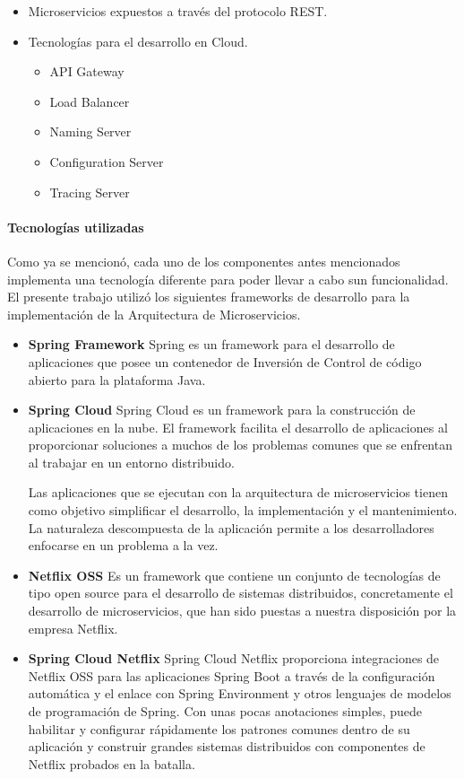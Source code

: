 \begin{itemize}
	\item Microservicios expuestos a través del protocolo REST.
	\item Tecnologías para el desarrollo en Cloud.
	\begin{itemize}
		\item API Gateway
		\item Load Balancer
		\item Naming Server
		\item Configuration Server
		\item Tracing Server
	\end{itemize}
\end{itemize}

\paragraph{Tecnologías utilizadas}
Como ya se mencionó, cada uno de los componentes antes mencionados implementa una tecnología diferente para poder llevar a cabo sun funcionalidad. El presente trabajo utilizó los siguientes frameworks de desarrollo para la implementación de la Arquitectura de Microservicios.

\begin{itemize}
\item \textbf{Spring Framework} Spring es un framework para el desarrollo de aplicaciones que posee un contenedor de Inversión de Control de código abierto para la plataforma Java.

\item \textbf{Spring Cloud} Spring Cloud es un framework para la construcción de aplicaciones en la nube. El framework facilita el desarrollo de aplicaciones al proporcionar soluciones a muchos de los problemas comunes que se enfrentan al trabajar en un entorno distribuido.

Las aplicaciones que se ejecutan con la arquitectura de microservicios tienen como objetivo simplificar el desarrollo, la implementación y el mantenimiento. La naturaleza descompuesta de la aplicación permite a los desarrolladores enfocarse en un problema a la vez.	
\item \textbf{Netflix OSS} Es un framework que contiene un conjunto de tecnologías de tipo open source para el desarrollo de sistemas distribuidos, concretamente el desarrollo de microservicios, que han sido puestas a nuestra disposición por la empresa Netflix.

\item \textbf{Spring Cloud Netflix} Spring Cloud Netflix proporciona integraciones de Netflix OSS para las aplicaciones Spring Boot a través de la configuración automática y el enlace con Spring Environment y otros lenguajes de modelos de programación de Spring. Con unas pocas anotaciones simples, puede habilitar y configurar rápidamente los patrones comunes dentro de su aplicación y construir grandes sistemas distribuidos con componentes de Netflix probados en la batalla.
\end{itemize}	
